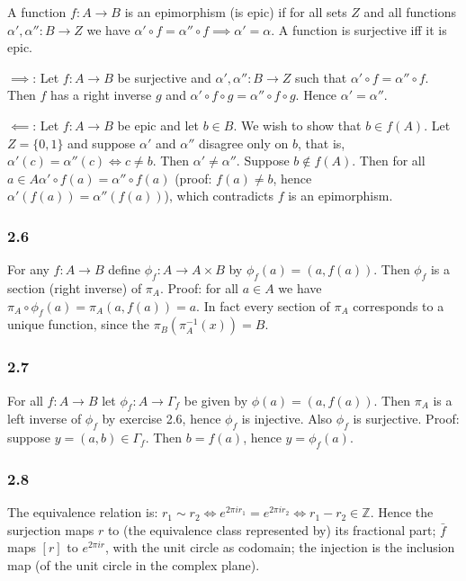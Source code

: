 \documentclass{article}
\def\Z{\mathbb{Z}}
\begin{document}
A function $f: A \to B$ is an epimorphism (is epic) if for all sets $Z$ and all functions $\alpha', \alpha'': B \to Z$ we have $\alpha' \circ f = \alpha'' \circ f \implies \alpha' = \alpha$. A function is surjective iff it is epic.

$\implies$: Let $f: A \to B$ be surjective and $\alpha', \alpha'': B \to Z$ such that $\alpha' \circ f = \alpha'' \circ f$. Then $f$ has a right inverse $g$ and $\alpha' \circ f \circ g = \alpha'' \circ f \circ g$. Hence $\alpha' = \alpha''$.

$\impliedby$: Let $f: A \to B$ be epic and let $b \in B$. We wish to show that $b \in f(A)$. Let $Z = \{0, 1\}$ and suppose $\alpha'$ and $\alpha''$ disagree only on $b$, that is, $\alpha'(c) = \alpha''(c) \iff c \ne b$. Then $\alpha' \ne \alpha''$. Suppose $b \not\in f(A)$. Then for all $a \in A \alpha' \circ f(a) = \alpha'' \circ f(a)$ (proof: $f(a) \ne b$, hence $\alpha'(f(a)) = \alpha''(f(a))$), which contradicts $f$ is an epimorphism.

\subsubsection*{2.6}

For any $f: A \to B$ define $\phi_f: A \to A \times B$ by $\phi_f(a) = (a, f(a))$. Then $\phi_f$ is a section (right inverse) of $\pi_A$. Proof: for all $a \in A$ we have $\pi_A \circ \phi_f (a) = \pi_A (a, f(a)) = a$. In fact every section of $\pi_A$ corresponds to a unique function, since the $\pi_B(\pi_A^{-1}(x)) = B$.

\subsubsection*{2.7}

For all $f: A \to B$ let $\phi_f: A \to \Gamma_f$ be given by $\phi(a) = (a, f(a))$. Then $\pi_A$ is a left inverse of $\phi_f$ by exercise 2.6, hence $\phi_f$ is injective. Also $\phi_f$ is surjective. Proof: suppose $y = (a, b) \in \Gamma_f$. Then $b = f(a)$, hence $y = \phi_f(a)$.

\subsubsection*{2.8}

The equivalence relation is: $r_1 \sim r_2 \iff e^{2\pi ir_1} = e^{2\pi ir_2} \iff r_1 - r_2 \in \Z$. Hence the surjection maps $r$ to (the equivalence class represented by) its fractional part; $\bar f$ maps $[r]$ to $e^{2\pi ir}$, with the unit circle as codomain; the injection is the inclusion map (of the unit circle in the complex plane).
\end{document}

